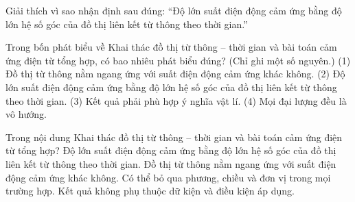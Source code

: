 \begin{bt}
Giải thích vì sao nhận định sau đúng: “Độ lớn suất điện động cảm ứng bằng độ lớn hệ số góc của đồ thị liên kết từ thông theo thời gian.”
\end{bt}

\begin{ex}
Trong bốn phát biểu về Khai thác đồ thị từ thông – thời gian và bài toán cảm ứng điện từ tổng hợp, có bao nhiêu phát biểu đúng? (Chỉ ghi một số nguyên.) (1) Đồ thị từ thông nằm ngang ứng với suất điện động cảm ứng khác không. (2) Độ lớn suất điện động cảm ứng bằng độ lớn hệ số góc của đồ thị liên kết từ thông theo thời gian. (3) Kết quả phải phù hợp ý nghĩa vật lí. (4) Mọi đại lượng đều là vô hướng.
\end{ex}

\begin{ex}
Trong nội dung Khai thác đồ thị từ thông – thời gian và bài toán cảm ứng điện từ tổng hợp?
\choice
{\True Độ lớn suất điện động cảm ứng bằng độ lớn hệ số góc của đồ thị liên kết từ thông theo thời gian.}
{Đồ thị từ thông nằm ngang ứng với suất điện động cảm ứng khác không.}
{Có thể bỏ qua phương, chiều và đơn vị trong mọi trường hợp.}
{Kết quả không phụ thuộc dữ kiện và điều kiện áp dụng.}
\end{ex}

